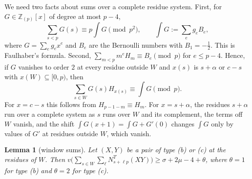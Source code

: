 \documentclass[11pt]{amsart}
\newtheorem{lemma}[theorem]{Lemma}
\theoremstyle{definition}
\theoremstyle{remark}
\numberwithin{equation}{section}
\newcommand{\Z}{\mathbb Z}
\begin{document}
We need two facts about sums over a complete residue system. First, for $G\in\Z_{(p)}[x]$ of degree at most $p-4$,
\begin{equation}\label{eq:faulhaber}
 \sum_{s<p}G(s)\equiv p\int G\pmod{p^2},\qquad \int G:=\sum_eg_eB_e,
\end{equation}
where $G=\sum_eg_ex^e$ and $B_e$ are the Bernoulli numbers with $B_1=-\frac12$. This is Faulhaber's formula. Second,
$\sum_{m<p}m^eH_m\equiv B_e\pmod p$ for $e\le p-4$. Hence, if $G$ vanishes to order $2$ at every residue outside $W$ and
$x(s)$ is $s+\alpha$ or $c-s$ with $x(W)\subseteq[0,p)$, then
\begin{equation}\label{eq:shift}
 \sum_{s\in W}G(s)H_{x(s)}\equiv\int G\pmod p .
\end{equation}
For $x=c-s$ this follows from $H_{p-1-m}\equiv H_m$. For $x=s+\alpha$, the residues $s+\alpha$ run over a complete
system as $s$ runs over $W$ and its complement, the terms off $W$ vanish, and the shift
$\int G(x+1)=\int G+G'(0)$ changes $\int G$ only by values of $G'$ at residues outside $W$, which vanish.

\begin{lemma}[window sums]\label{lem:window}
Let $(X,Y)$ be a pair of type (b) or (c) at the residues of $W$. Then
$v\bigl(\sum_{s\in W}\sum_\ell N^T_{s+\ell p}(XY)\bigr)\ge\sigma+2\mu-4+\theta$, where $\theta=1$ for type (b) and
$\theta=2$ for type (c).
\end{lemma}
\end{document}
